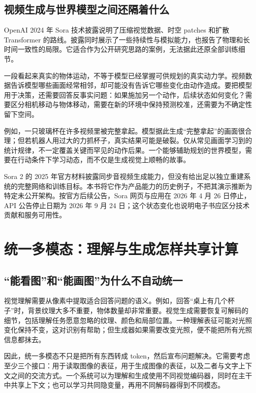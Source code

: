 \subsection{视频生成与世界模型之间还隔着什么}

OpenAI 2024 年 Sora 技术披露说明了压缩视觉数据、时空 patches 和扩散 Transformer 的路线。披露同时展示了一些持续性与模拟能力，也报告了物理和长时间一致性的局限。它适合作为公开研究思路的案例，无法据此还原全部训练细节。\cite{a_sora2024}

一段看起来真实的物体运动，不等于模型已经掌握可供规划的真实动力学。视频数据告诉模型哪些画面经常相邻，却可能没有告诉它哪些变化由动作造成。要把模型用于决策，还需要回答反事实问题：如果施加另一个动作，后续状态如何变化？需要区分相机移动与物体移动，需要在新的环境中保持预测校准，还需要为不确定性留下空间。

例如，一只玻璃杯在许多视频里被完整拿起。模型据此生成“完整拿起”的画面很合理；但若机器人用过大的力抓杯子，真实结果可能是破裂。仅从常见画面学习到的统计规律，不一定覆盖关键而罕见的动作后果。一个能够辅助规划的世界模型，需要在行动条件下学习动态，而不仅是生成视觉上顺畅的故事。

Sora 2 的 2025 年官方材料披露同步音视频生成能力，但没有给出足以独立重建系统的完整网络和训练目标。本书将它作为产品能力的历史例子，不把其演示推断为特定未公开架构。按官方后续公告，Sora 网页与应用在 2026 年 4 月 26 日停止，API 公告停止日期为 2026 年 9 月 24 日；这个状态变化也说明电子书应区分技术贡献和服务可用性。\cite{a_sora2,a_soraend}

\section{统一多模态：理解与生成怎样共享计算}
\label{sec:application-unified}

\subsection{“能看图”和“能画图”为什么不自动统一}

视觉理解需要从像素中提取适合回答问题的语义。例如，回答“桌上有几个杯子”时，背景纹理大多不重要，物体数量却非常重要。视觉生成需要恢复可解码的细节，包括理解任务愿意忽略的纹理、颜色和局部位置。一种理解表征可能对光照变化保持不变，这对识别有帮助；但生成器如果需要改变光照，便不能把所有光照信息都抹去。

因此，统一多模态不只是把所有东西转成 token，然后宣布问题解决。它需要考虑至少三个接口：用于读取图像的表征，用于生成图像的表征，以及二者与文字上下文之间的交流方式。一个系统可以为理解和生成使用不同视觉编码器，同时在主干中共享上下文；也可以学习共同隐变量，再用不同解码器得到不同模态。

